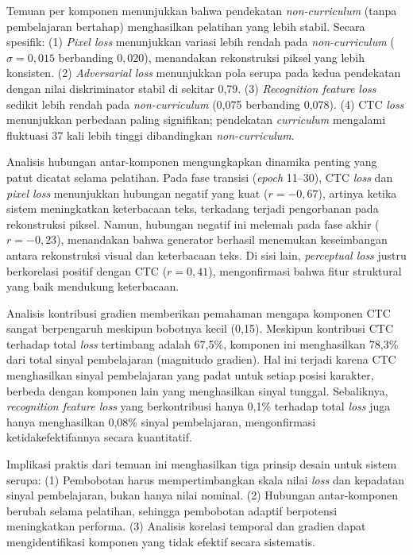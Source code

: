\documentclass[12pt,a4paper]{article}
\begin{document}
\begin{enumerate}[leftmargin=1.5em, labelsep=0.5em, itemindent=0pt, label=\arabic*., topsep=0pt, partopsep=0pt]
    Temuan per komponen menunjukkan bahwa pendekatan \textit{non-curriculum} (tanpa pembelajaran bertahap) menghasilkan pelatihan yang lebih stabil. Secara spesifik: (1) \textit{Pixel loss} menunjukkan variasi lebih rendah pada \textit{non-curriculum} ($\sigma = 0,015$ berbanding $0,020$), menandakan rekonstruksi piksel yang lebih konsisten. (2) \textit{Adversarial loss} menunjukkan pola serupa pada kedua pendekatan dengan nilai diskriminator stabil di sekitar 0,79. (3) \textit{Recognition feature loss} sedikit lebih rendah pada \textit{non-curriculum} (0,075 berbanding 0,078). (4) CTC \textit{loss} menunjukkan perbedaan paling signifikan; pendekatan \textit{curriculum} mengalami fluktuasi 37 kali lebih tinggi dibandingkan \textit{non-curriculum}.

    Analisis hubungan antar-komponen mengungkapkan dinamika penting yang patut dicatat selama pelatihan. Pada fase transisi (\textit{epoch} 11--30), CTC \textit{loss} dan \textit{pixel loss} menunjukkan hubungan negatif yang kuat ($r = -0,67$), artinya ketika sistem meningkatkan keterbacaan teks, terkadang terjadi pengorbanan pada rekonstruksi piksel. Namun, hubungan negatif ini melemah pada fase akhir ($r = -0,23$), menandakan bahwa generator berhasil menemukan keseimbangan antara rekonstruksi visual dan keterbacaan teks. Di sisi lain, \textit{perceptual loss} justru berkorelasi positif dengan CTC ($r = 0,41$), mengonfirmasi bahwa fitur struktural yang baik mendukung keterbacaan.

    Analisis kontribusi gradien memberikan pemahaman mengapa komponen CTC sangat berpengaruh meskipun bobotnya kecil (0,15). Meskipun kontribusi CTC terhadap total \textit{loss} tertimbang adalah 67,5\%, komponen ini menghasilkan 78,3\% dari total sinyal pembelajaran (magnitudo gradien). Hal ini terjadi karena CTC menghasilkan sinyal pembelajaran yang padat untuk setiap posisi karakter, berbeda dengan komponen lain yang menghasilkan sinyal tunggal. Sebaliknya, \textit{recognition feature loss} yang berkontribusi hanya 0,1\% terhadap total \textit{loss} juga hanya menghasilkan 0,08\% sinyal pembelajaran, mengonfirmasi ketidakefektifannya secara kuantitatif.

    Implikasi praktis dari temuan ini menghasilkan tiga prinsip desain untuk sistem serupa: (1) Pembobotan harus mempertimbangkan skala nilai \textit{loss} dan kepadatan sinyal pembelajaran, bukan hanya nilai nominal. (2) Hubungan antar-komponen berubah selama pelatihan, sehingga pembobotan adaptif berpotensi meningkatkan performa. (3) Analisis korelasi temporal dan gradien dapat mengidentifikasi komponen yang tidak efektif secara sistematis.


\end{enumerate}
\end{document}
